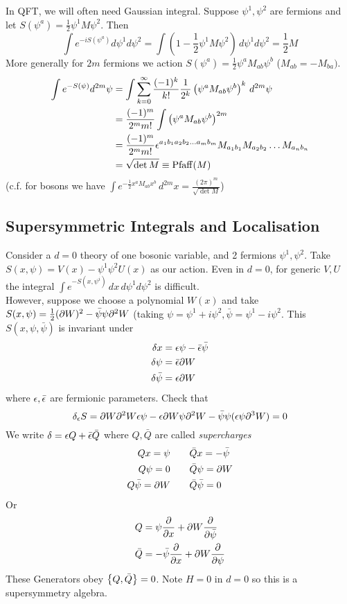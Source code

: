 \documentclass{article}
\begin{document}
In QFT, we will often need Gaussian integral. Suppose $\psi^1, \psi^2$ are fermions and let $S(\psi^a) = \frac{1}{2}\psi^1 M \psi^2$. Then 
\[
\int e^{-iS(\psi^a)} d\psi^1 d\psi^2 = \int \left( 1- \frac{1}{2} \psi^1 M \psi^2 \right) \, d\psi^1 d\psi^2 = \frac{1}{2}M
\]
More generally for $2m$ fermions we action $S(\psi^a) = \frac{1}{2} \psi^a M_{ab} \psi^b$ ($M_{ab}=-M_{ba})$. 
\begin{align*}
    \int e^{-S(\psi)} d^{2m}\psi &= \int \sum_{k=0}^\infty \frac{(-1)^k}{k!} \frac{1}{2^k} \left( \psi^a M_{ab} \psi^b \right)^k \, d^{2m}\psi \\
    &=\frac{(-1)^m}{2^m m!} \int \left( \psi^a M_{ab} \psi^b \right)^{2m} \\
    &= \frac{(-1)^m}{2^m m!} \eps^{a_1 b_1 a_2 b_2 \dots a_m b_m} M_{a_1 b_1} M_{a_2 b_2} \dots M_{a_n b_n} \\
    &= \sqrt{\det M} \equiv \Pfaff(M)
\end{align*}
(c.f. for bosons we have $\int e^{-\frac{1}{2} x^a M_{ab} x^b} \, d^{2m} x = \frac{(2\pi)^m}{\sqrt{\det M}} $)

\subsection{Supersymmetric Integrals and Localisation}
Consider a $d=0$ theory of one bosonic variable, and 2 fermions  $\psi^1,\psi^2$. Take $S(x,\psi) = V(x)-\psi^1 \psi^2 U(x)$ as our action. Even in $d=0$, for generic $V,U$ the integral $\int e^{-S(x,\psi^i)}\, dx \, d\psi^1 d\psi^2$ is difficult. \\
However, suppose we choose a polynomial $W(x)$ and take $S(x,\psi) = \frac{1}{2} (\del W)^2 - \bar{\psi} \psi \del^2 W$ (taking $\psi = \psi^1 + i \psi^2, \bar{\psi} = \psi^1 -i \psi^2$. This $S(x,\psi,  \bar{\psi})$ is invariant under 
\begin{align*}
\delta x &= \eps \psi - \bar{\eps} \bar{\psi} \\
\delta \psi &= \bar{\eps} \del W \\
\delta \bar{\psi} &= \eps \del W 
\end{align*}
where $\eps,\bar{\eps}$ are fermionic parameters. Check that 
\[
\delta_\eps S = \del W \del^2 W \eps \psi-\eps\del W \psi \del^2 W - \bar{\psi}\psi(\eps \psi \del^3 W) = 0 
\]
We write $\delta = \eps Q + \bar{\eps} \bar{Q}$ where $Q,\bar{Q}$ are called \emph{supercharges}
\begin{align*}
    Qx = \psi &\qquad \bar{Q}x = -\bar{\psi} \\
    Q \psi = 0 &\qquad \bar{Q} \psi = \del W \\
    Q \bar{\psi} = \del W &\qquad \bar{Q} \bar{\psi} = 0
\end{align*}
Or 
\begin{align*}
    Q &= \psi \pd{x} + \del W \pd{\bar{\psi}} \\
    \bar{Q} &= -\bar{\psi} \pd{x} + \del W \pd{\psi}
\end{align*}
These Generators obey $\acomm[Q]{\bar{Q}}=0$. Note $H=0$ in $d=0$ so this is a supersymmetry algebra.
\end{document}
